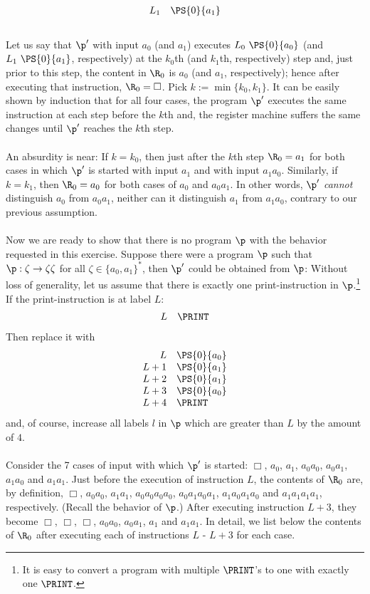 \begin{enumerate}[1.]
\[\begin{array}{rl}
L_1 & \PS{0}{a_1}
\end{array}
\]
\ \\
Let us say that $\p^\prime$ with input $a_0$ (and $a_1$) executes $L_0 \ \PS{0}{a_0}$ (and $L_1 \ \PS{0}{a_1}$, respectively) at the $k_0$th (and $k_1$th, respectively) step and, just prior to this step, the content in $\R_0$ is $a_0$ (and $a_1$, respectively); hence after executing that instruction, $\R_0 = \Box$. Pick $k := \min \{ k_0, k_1 \}$. It can be easily shown by induction that for all four cases, the program $\p^\prime$ executes the same instruction at each step before the $k$th and, the register machine suffers the same changes until $\p^\prime$ reaches the $k$th step.\\
\ \\
An absurdity is near: If $k = k_0$, then just after the $k$th step $\R_0 = a_1$ for both cases in which $\p^\prime$ is started with input $a_1$ and with input $a_1a_0$. Similarly, if $k = k_1$, then $\R_0 = a_0$ for both cases of $a_0$ and $a_0a_1$. In other words, $\p^\prime$ \emph{cannot} distinguish $a_0$ from $a_0a_1$, neither can it distinguish $a_1$ from $a_1a_0$, contrary to our previous assumption.\\
\ \\
Now we are ready to show that there is no program $\p$ with the behavior requested in this exercise. Suppose there were a program $\p$ such that $\p : \zeta \to \zeta\zeta$ for all $\zeta \in \{ a_0, a_1 \}^\ast$, then $\p^\prime$ could be obtained from $\p$: Without loss of generality, let us assume that there is exactly one print-instruction in $\p$.\footnote{It is easy to convert a program with multiple $\PRINT$'s to one with exactly one $\PRINT$.} If the print-instruction is at label $L$:
\[
\begin{array}{rl}
L & \PRINT
\end{array}
\]
Then replace it with
\[
\begin{array}{rl}
L & \PS{0}{a_0} \cr
L + 1 & \PS{0}{a_1} \cr
L + 2 & \PS{0}{a_1} \cr
L + 3 & \PS{0}{a_0} \cr
L + 4 & \PRINT
\end{array}
\]
and, of course, increase all labels $l$ in $\p$ which are greater than $L$ by the amount of $4$.\\
\ \\
Consider the 7 cases of input with which $\p^\prime$ is started: $\Box$, $a_0$, $a_1$, $a_0a_0$, $a_0a_1$, $a_1a_0$ and $a_1a_1$. Just before the execution of instruction $L$, the contents of $\R_0$ are, by definition, $\Box$, $a_0a_0$, $a_1a_1$, $a_0a_0a_0a_0$, $a_0a_1a_0a_1$, $a_1a_0a_1a_0$ and $a_1a_1a_1a_1$, respectively. (Recall the behavior of $\p$.) After executing instruction $L + 3$, they become $\Box$, $\Box$, $\Box$, $a_0a_0$, $a_0a_1$, $a_1$ and $a_1a_1$. In detail, we list below the contents of $\R_0$ after executing each of instructions $L$ - $L + 3$ for each case.

\end{enumerate}
